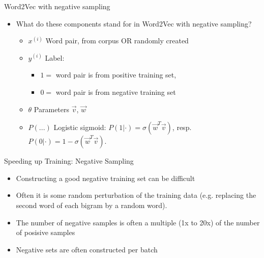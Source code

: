 
\begin{vbframe}{Word2Vec with negative sampling}

\vfill

\begin{itemize}
	\item \ques What do these components stand for in Word2Vec with negative sampling?
		\begin{itemize}
			\item $x^{(i)}$ Word pair, from corpus OR randomly created
			\item $y^{(i)}$ Label: 
					\begin{itemize}
						\item $1 = $ word pair is from positive training set,
						\item $0 = $ word pair is from negative training set
					\end{itemize} 
			\item $\theta$ Parameters $\vec v$, $\vec w$
			\item $P(...)$ Logistic sigmoid: $P(1|\cdot) = \sigma(\vec w^T \vec v)$, resp. $P(0|\cdot) = 1-\sigma(\vec w^T \vec v)$.
		\end{itemize}
\end{itemize}

\vfill

\end{vbframe}


\begin{vbframe}{Speeding up Training: Negative Sampling}

\vfill

\begin{itemize}
	\item Constructing a good negative training set can be difficult
	\item Often it is some random perturbation of the training data (e.g. replacing the second word of each bigram by a random word).
	\item The number of negative samples is often a multiple (1x to 20x) of the number of posisive samples
	\item Negative sets are often constructed per batch
\end{itemize}

\vfill

\end{vbframe}

